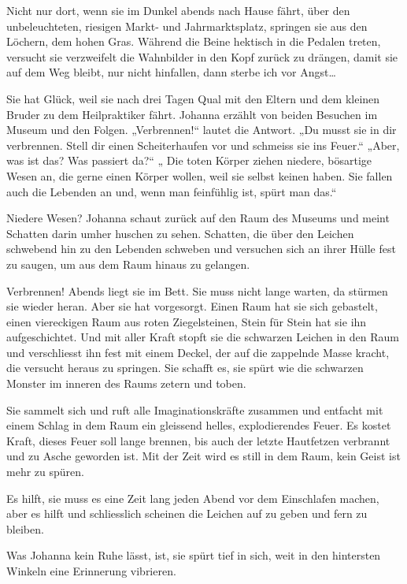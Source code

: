 \documentclass[10pt,titlepage,a5paper]{book}
\begin{document}
Nicht nur dort, wenn sie im Dunkel abends nach Hause fährt, über den unbeleuchteten, riesigen Markt- und Jahrmarktsplatz, springen sie aus den Löchern, dem hohen Gras. Während die Beine hektisch in die Pedalen treten, versucht sie verzweifelt die Wahnbilder in den Kopf zurück zu drängen, damit sie auf dem Weg bleibt, nur nicht hinfallen, dann sterbe ich vor Angst\dots 

Sie hat Glück, weil sie nach drei Tagen Qual mit den Eltern und dem kleinen Bruder zu dem Heilpraktiker fährt. Johanna erzählt von beiden Besuchen im Museum und den Folgen. „Verbrennen!“ lautet die Antwort. „Du musst sie in dir verbrennen. Stell dir einen Scheiterhaufen vor und schmeiss sie ins Feuer.“ „Aber, was ist das? Was passiert da?“  „ Die toten Körper ziehen niedere, bösartige Wesen an, die gerne einen Körper wollen, weil sie selbst keinen haben. Sie fallen auch die Lebenden an und, wenn man feinfühlig ist, spürt man das.“

Niedere Wesen? Johanna schaut zurück auf den Raum des Museums und meint Schatten darin umher huschen zu sehen. Schatten, die über den Leichen schwebend hin zu den Lebenden schweben und versuchen sich an ihrer Hülle fest zu saugen, um aus dem Raum hinaus zu gelangen. 

Verbrennen! Abends liegt sie im Bett. Sie muss nicht lange warten, da stürmen sie wieder heran. Aber sie hat vorgesorgt. Einen Raum hat sie sich gebastelt, einen viereckigen Raum aus roten Ziegelsteinen, Stein für Stein hat sie ihn aufgeschichtet. Und mit aller Kraft stopft sie die schwarzen Leichen in den Raum und verschliesst ihn fest mit einem Deckel, der auf die zappelnde Masse kracht, die versucht heraus zu springen. Sie schafft es, sie spürt wie die schwarzen Monster im inneren des Raums zetern und toben. 

Sie sammelt sich und ruft alle Imaginationskräfte zusammen und entfacht mit einem Schlag in dem Raum ein gleissend helles, explodierendes Feuer. Es kostet Kraft, dieses Feuer soll lange brennen, bis auch der letzte Hautfetzen verbrannt und zu Asche geworden ist. Mit der Zeit wird es still in dem Raum, kein Geist ist mehr zu spüren.

Es hilft, sie muss es eine Zeit lang jeden Abend vor dem Einschlafen machen, aber es hilft und schliesslich scheinen die Leichen auf zu geben und fern zu bleiben.

Was Johanna kein Ruhe lässt, ist, sie spürt tief in sich, weit in den hintersten Winkeln eine Erinnerung vibrieren. 
\end{document}

